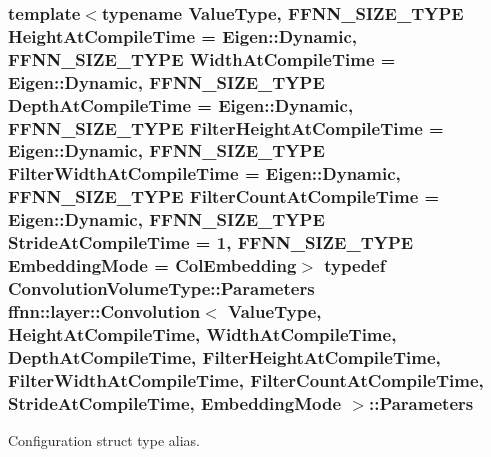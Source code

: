 \hypertarget{classffnn_1_1layer_1_1_convolution_af24f8cf9f456c36863d6e2d90592a057}{
\subsubsection[{Parameters}]{\setlength{\rightskip}{0pt plus 5cm}template$<$typename Value\-Type, F\-F\-N\-N\-\_\-\-S\-I\-Z\-E\-\_\-\-T\-Y\-P\-E Height\-At\-Compile\-Time = Eigen\-::\-Dynamic, F\-F\-N\-N\-\_\-\-S\-I\-Z\-E\-\_\-\-T\-Y\-P\-E Width\-At\-Compile\-Time = Eigen\-::\-Dynamic, F\-F\-N\-N\-\_\-\-S\-I\-Z\-E\-\_\-\-T\-Y\-P\-E Depth\-At\-Compile\-Time = Eigen\-::\-Dynamic, F\-F\-N\-N\-\_\-\-S\-I\-Z\-E\-\_\-\-T\-Y\-P\-E Filter\-Height\-At\-Compile\-Time = Eigen\-::\-Dynamic, F\-F\-N\-N\-\_\-\-S\-I\-Z\-E\-\_\-\-T\-Y\-P\-E Filter\-Width\-At\-Compile\-Time = Eigen\-::\-Dynamic, F\-F\-N\-N\-\_\-\-S\-I\-Z\-E\-\_\-\-T\-Y\-P\-E Filter\-Count\-At\-Compile\-Time = Eigen\-::\-Dynamic, F\-F\-N\-N\-\_\-\-S\-I\-Z\-E\-\_\-\-T\-Y\-P\-E Stride\-At\-Compile\-Time = 1, F\-F\-N\-N\-\_\-\-S\-I\-Z\-E\-\_\-\-T\-Y\-P\-E Embedding\-Mode = Col\-Embedding$>$ typedef {\bf Convolution\-Volume\-Type\-::\-Parameters} {\bf ffnn\-::layer\-::\-Convolution}$<$ Value\-Type, Height\-At\-Compile\-Time, Width\-At\-Compile\-Time, Depth\-At\-Compile\-Time, Filter\-Height\-At\-Compile\-Time, Filter\-Width\-At\-Compile\-Time, Filter\-Count\-At\-Compile\-Time, Stride\-At\-Compile\-Time, {\bf Embedding\-Mode} $>$\-::{\bf Parameters}}}\label{classffnn_1_1layer_1_1_convolution_af24f8cf9f456c36863d6e2d90592a057}


Configuration struct type alias. 

